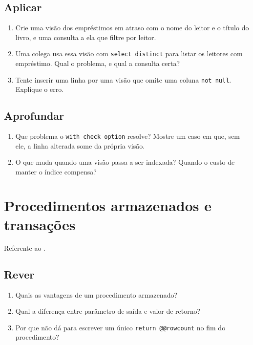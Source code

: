 \subsection*{Aplicar}
\begin{enumerate}
	\item Crie uma visão dos empréstimos em atraso com o nome do leitor e
	o título do livro, e uma consulta a ela que filtre por leitor.
	\item Uma colega usa essa visão com \texttt{select distinct} para
	listar os leitores com empréstimo. Qual o problema, e qual a consulta
	certa?
	\item Tente inserir uma linha por uma visão que omite uma coluna
	\texttt{not null}. Explique o erro.
\end{enumerate}

\subsection*{Aprofundar}
\begin{enumerate}
	\item Que problema o \texttt{with check option} resolve? Mostre um
	caso em que, sem ele, a linha alterada some da própria visão.
	\item O que muda quando uma visão passa a ser indexada? Quando o
	custo de manter o índice compensa?
\end{enumerate}

\section{Procedimentos armazenados e transações}

Referente ao .

\subsection*{Rever}
\begin{enumerate}
	\item Quais as vantagens de um procedimento armazenado?
	\item Qual a diferença entre parâmetro de saída e valor de retorno?
	\item Por que não dá para escrever um único \texttt{return
	@@rowcount} no fim do procedimento?
\end{enumerate}

